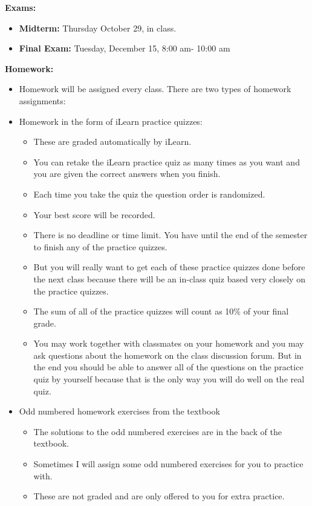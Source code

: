 \documentclass[oneside,12pt]{amsart}
\begin{document}
\bigskip

\textbf{Exams:}
\begin{itemize}
\item \textbf{Midterm:} Thursday October 29, in class.
\item \textbf{Final Exam:} Tuesday, December 15, 8:00 am- 10:00 am
\end{itemize}

\bigskip

\textbf{Homework:}
\begin{itemize}
\item Homework will be assigned every class. There are two types of homework assignments:
\item Homework in the form of iLearn practice quizzes:
  \begin{itemize}
    \item These are graded automatically by iLearn.
    \item You can retake the iLearn practice quiz as many times as you want and you are given the correct answers when you finish.
    \item Each time you take the quiz the question order is randomized.
    \item Your best score will be recorded.
    \item There is no deadline or time limit. You have until the end of the semester to finish any of the practice quizzes.
    \item But you will really want to get each of these practice quizzes done before the next class because there will
    be an in-class quiz based very closely on the practice quizzes.
    \item The sum of all of the practice quizzes will count as 10\% of your final grade.
    \item You may work together with classmates on your homework and you may ask questions about the homework on the
    class discussion forum. But in the end you should be able to answer all of the questions on the practice quiz
    by yourself because that is the only way you will do well on the real quiz.
  \end{itemize}
\item Odd numbered homework exercises from the textbook
\begin{itemize}
    \item The solutions to the odd numbered exercises are in the back of the textbook.
    \item Sometimes I will assign some odd numbered exercises for you to practice with.
    \item These are not graded and are only offered to you for extra practice.
  \end{itemize}
\end{itemize}
\end{document}
